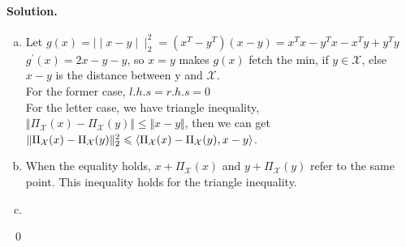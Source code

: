 \documentclass[a4paper]{article}
\newenvironment{solution}
{\color{blue} \paragraph{Solution.}}
{\newline \qed}
\begin{document}
\begin{solution}
\begin{enumerate}[a)]
    \item Let $g(x) = \mid \mid x - y \mid \mid _2 ^2 = (x^T - y^T) (x - y) = x^Tx - y^Tx - x^Ty + y^Ty$\\
    $g^{'}(x) = 2x - y - y$, so $x = y$ makes $g(x)$ fetch the min, if $y \in \mathcal{X}$, else $x - y$ is the distance between y and $\mathcal{X}$.\\
    For the former case, $l.h.s = r.h.s = 0$\\
    For the letter case, we have triangle inequality, $\Vert \Pi_{\mathcal{X}} (x) - \Pi_{\mathcal{X}} (y) \Vert \leq \Vert x - y \Vert$, then we can get $\Vert \Pi_{\mathcal{X}} (x) - \Pi_{\mathcal{X}} (y) \Vert^2_2 \leqslant \Braket{\Pi_{\mathcal{X}} (x) - \Pi_{\mathcal{X}} (y), x - y}$.
    

    \item When the equality holds, $x + \Pi_{\mathcal{X}}(x)$ and $y + \Pi_{\mathcal{X}}(y)$ refer to the same point. This inequality holds for the triangle inequality.

    \item  
\end{enumerate}
\
\end{solution}
\end{document}
